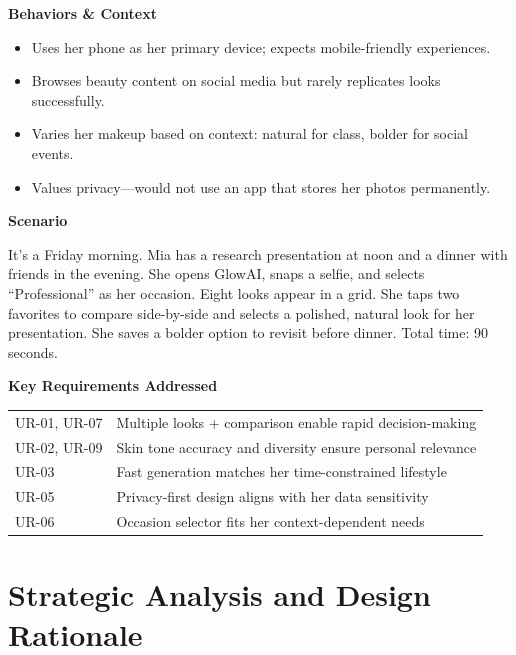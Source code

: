 \documentclass[11pt, letterpaper]{article}
\begin{document}
\begin{tcolorbox}[
    colback=white,
    colframe=black!70,
    title={\large\bfseries Primary Persona: Mia},
    fonttitle=\bfseries,
    boxrule=1pt,
    arc=3mm,
    top=4mm, bottom=4mm, left=4mm, right=4mm
]
\vspace{6pt}
\textbf{\large Behaviors \& Context}
\begin{itemize}[leftmargin=*, nosep, topsep=2pt]
    \item Uses her phone as her primary device; expects mobile-friendly experiences.
    \item Browses beauty content on social media but rarely replicates looks successfully.
    \item Varies her makeup based on context: natural for class, bolder for social events.
    \item Values privacy---would not use an app that stores her photos permanently.
\end{itemize}

\vspace{6pt}
\textbf{\large Scenario}
\vspace{2pt}

It's a Friday morning. Mia has a research presentation at noon and a dinner with friends in the evening. She opens GlowAI, snaps a selfie, and selects ``Professional'' as her occasion. Eight looks appear in a grid. She taps two favorites to compare side-by-side and selects a polished, natural look for her presentation. She saves a bolder option to revisit before dinner. Total time: 90 seconds.

\vspace{6pt}
\textbf{\large Key Requirements Addressed}
\vspace{2pt}

\begin{tabularx}{\textwidth}{l X}
UR-01, UR-07 & Multiple looks + comparison enable rapid decision-making \\
UR-02, UR-09 & Skin tone accuracy and diversity ensure personal relevance \\
UR-03 & Fast generation matches her time-constrained lifestyle \\
UR-05 & Privacy-first design aligns with her data sensitivity \\
UR-06 & Occasion selector fits her context-dependent needs \\
\end{tabularx}

\end{tcolorbox}

\newpage
\section{Strategic Analysis and Design Rationale}
\end{document}
